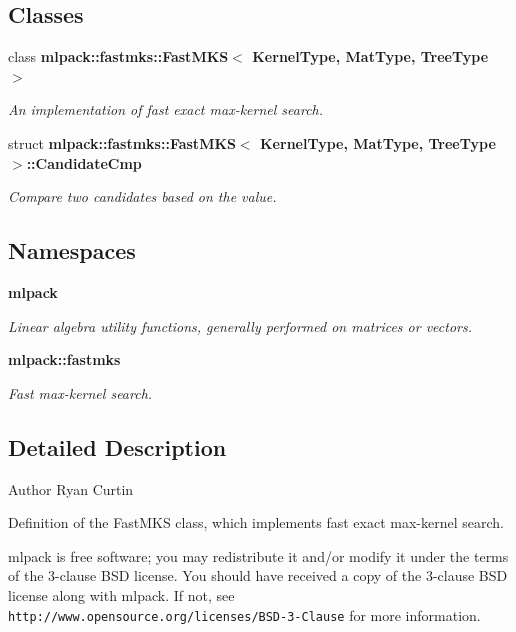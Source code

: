 \subsection*{Classes}
\begin{DoxyCompactItemize}
\item 
class {\bf mlpack\+::fastmks\+::\+Fast\+M\+K\+S$<$ Kernel\+Type, Mat\+Type, Tree\+Type $>$}
\begin{DoxyCompactList}\small\item\em An implementation of fast exact max-\/kernel search. \end{DoxyCompactList}\item 
struct {\bf mlpack\+::fastmks\+::\+Fast\+M\+K\+S$<$ Kernel\+Type, Mat\+Type, Tree\+Type $>$\+::\+Candidate\+Cmp}
\begin{DoxyCompactList}\small\item\em Compare two candidates based on the value. \end{DoxyCompactList}\end{DoxyCompactItemize}
\subsection*{Namespaces}
\begin{DoxyCompactItemize}
\item 
 {\bf mlpack}
\begin{DoxyCompactList}\small\item\em Linear algebra utility functions, generally performed on matrices or vectors. \end{DoxyCompactList}\item 
 {\bf mlpack\+::fastmks}
\begin{DoxyCompactList}\small\item\em Fast max-\/kernel search. \end{DoxyCompactList}\end{DoxyCompactItemize}


\subsection{Detailed Description}
\begin{DoxyAuthor}{Author}
Ryan Curtin
\end{DoxyAuthor}
Definition of the Fast\+M\+KS class, which implements fast exact max-\/kernel search.

mlpack is free software; you may redistribute it and/or modify it under the terms of the 3-\/clause B\+SD license. You should have received a copy of the 3-\/clause B\+SD license along with mlpack. If not, see {\tt http\+://www.\+opensource.\+org/licenses/\+B\+S\+D-\/3-\/\+Clause} for more information. 